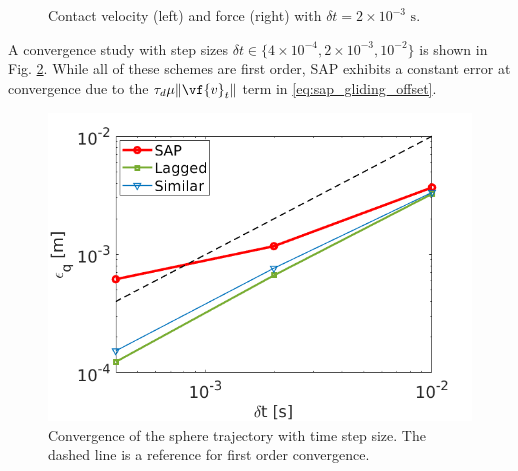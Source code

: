 \begin{figure}[!h]
    \centering
    \caption{\label{fig:cylinder_contact_velocity_and_force} Contact velocity (left)
    and force (right) with $\delta t=2\times10^{-3}\text{ s}$.}
\end{figure}

A convergence study with step sizes $\delta t \in \{4\times10^{-4},
2\times10^{-3}, 10^{-2}\}$ is shown in Fig.
\ref{fig:cylinder_convergence_position}. While all of these schemes are first
order, SAP exhibits a constant error at convergence due to the
$\tau_d\mu\Vert\vf{v}_t\Vert$ term in \eqref{eq:sap_gliding_offset}.

\begin{figure}[!h]
    \centering
    \includegraphics[width=0.8\columnwidth]{figures/TestCases/Cylinder/position_convergence.png}
    \caption{Convergence of the sphere trajectory with time step size. The dashed line is a reference for first order convergence.}
    \label{fig:cylinder_convergence_position}
\end{figure}
